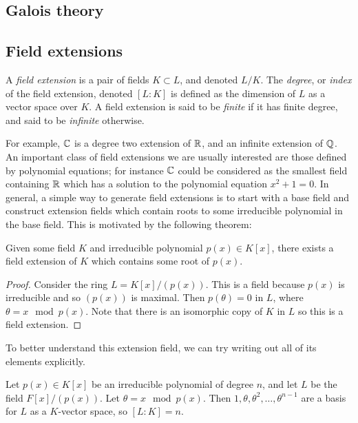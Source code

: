 \documentclass[11pt,letterpaper]{article}
\begin{document}
\begin{appendices}
\section{Galois theory}


\subsection{Field extensions}
\begin{definition}
    A \emph{field extension} is a pair of fields $K\subset L$, and denoted $L /K$. The \emph{degree}, or \emph{index} of the field extension, denoted $[L : K]$ is defined as the dimension of $L$ as a vector space over $K$. A field extension is said to be \emph{finite} if it has finite degree, and said to be \emph{infinite} otherwise.
\end{definition}

For example, $\mathbb{C}$ is a degree two extension of $\mathbb{R}$, and an infinite extension of $\mathbb{Q}$. An important class of field extensions we are usually interested are those defined by polynomial equations; for instance $\mathbb{C}$ could be considered as the smallest field containing $\mathbb{R}$ which has a solution to the polynomial equation $x^2+1=0$. In general, a simple way to generate field extensions is to start with a base field and construct extension fields which contain roots to some irreducible polynomial in the base field. This is motivated by the following theorem:

\begin{theorem}
    Given some field $K$ and irreducible polynomial $p(x)\in K[x]$, there exists a field extension of $K$ which contains some root of $p(x)$.
\end{theorem}
\begin{proof}
    Consider the ring $L=K[x] /(p(x))$. This is a field because $p(x)$ is irreducible and so $(p(x))$ is maximal. Then $p(\theta)=0$ in $L$, where $\theta=x\mod p(x)$. Note that there is an isomorphic copy of $K$ in $L$ so this is a field extension.
\end{proof}

To better understand this extension field, we can try writing out all of its elements explicitly.

\begin{theorem}
    Let $p(x)\in K[x]$ be an irreducible polynomial of degree $n$, and let $L$ be the field $F[x]/(p(x))$. Let $\theta=x\mod p(x)$. Then $1,\theta,\theta^2,\ldots,\theta^{n-1}$ are a basis for $L$ as a $K$-vector space, so $[L : K]=n$. 
\end{theorem}


\end{appendices}
\end{document}
